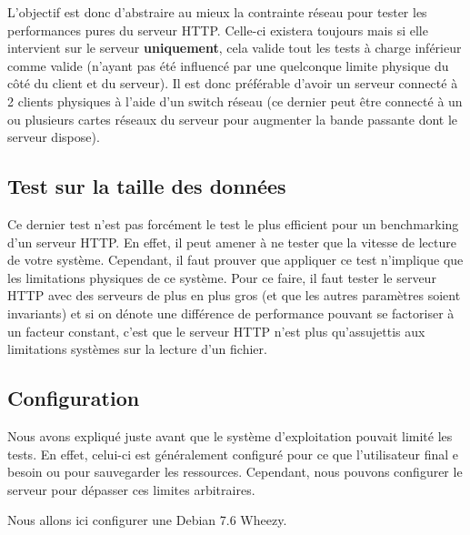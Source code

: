\documentclass[a4paper, 11pt]{article}
\begin{document}
L'objectif est  donc d'abstraire au mieux  la contrainte réseau  pour tester les
performances pures  du serveur  HTTP.  Celle-ci existera  toujours mais  si elle
intervient sur  le serveur  \textbf{uniquement},  cela valide  tout les  tests à
charge  inférieur comme  valide (n'ayant  pas été  influencé par  une quelconque
limite physique du  côté  du  client  et  du  serveur).  Il  est donc préférable
d'avoir un  serveur connecté à 2  clients physiques à l'aide  d'un switch réseau
(ce dernier peut être connecté à un  ou plusieurs cartes réseaux du serveur pour
augmenter la bande passante dont le serveur dispose).

\subsection{Test sur la taille des données}

Ce  dernier  test  n'est  pas  forcément  le  test  le  plus  efficient  pour un
benchmarking d'un  serveur HTTP.  En effet,  il peut  amener à ne  tester que la
vitesse de lecture de votre  système.  Cependant,  il faut prouver que appliquer
ce test n'implique que les limitations  physiques de ce système.  Pour ce faire,
il faut tester  le serveur HTTP avec des  serveurs de plus en plus  gros (et que
les autres paramètres  soient  invariants)  et  si  on  dénote une différence de
performance pouvant se  factoriser à un facteur constant,  c'est  que le serveur
HTTP n'est plus  qu'assujettis  aux  limitations  systèmes  sur  la lecture d'un
fichier\footnotemark[1].


\subsection{Configuration}

Nous avons  expliqué juste  avant que le  système d'exploitation  pouvait limité
les  tests.   En  effet,   celui-ci  est  généralement  configuré  pour  ce  que
l'utilisateur  final e  besoin ou  pour sauvegarder  les ressources.  Cependant,
nous pouvons configurer le serveur pour dépasser ces limites arbitraires.

Nous allons ici configurer une Debian 7.6 Wheezy.
\end{document}
